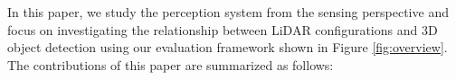 \documentclass[10pt,twocolumn,letterpaper]{article}
\begin{document}
In this paper, we study the perception system from the sensing perspective and focus on investigating the relationship between LiDAR configurations and 3D object detection using our evaluation framework shown in Figure \ref{fig:overview}.
The contributions of this paper are summarized as follows:
\end{document}
